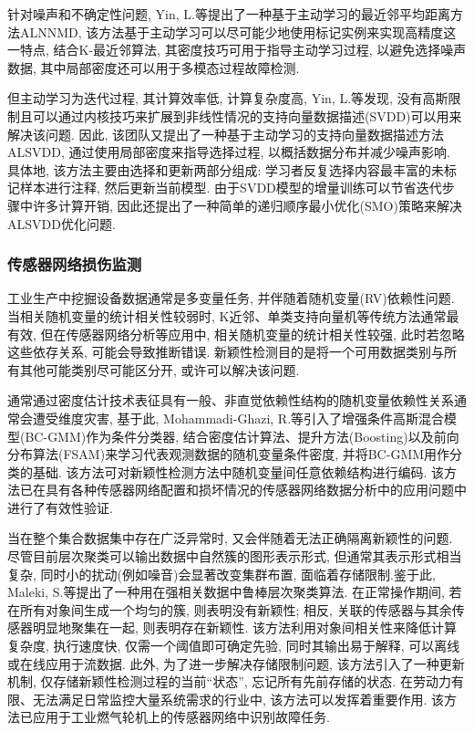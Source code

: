 \documentclass{Style/aas}
\begin{document}
\begin{multicols}{2}
  针对噪声和不确定性问题, Yin, L.等\cite{yin2018active}提出了一种基于主动学习的最近邻平均距离方法ALNNMD, 该方法基于主动学习可以尽可能少地使用标记实例来实现高精度这一特点, 结合K-最近邻算法, 其密度技巧可用于指导主动学习过程, 以避免选择噪声数据, 其中局部密度还可以用于多模态过程故障检测.

  但主动学习为迭代过程, 其计算效率低, 计算复杂度高, Yin, L.等\cite{yin2018active}发现, 没有高斯限制且可以通过内核技巧来扩展到非线性情况的支持向量数据描述(SVDD)可以用来解决该问题. 因此, 该团队又提出了一种基于主动学习的支持向量数据描述方法ALSVDD, 通过使用局部密度来指导选择过程, 以概括数据分布并减少噪声影响. 具体地, 该方法主要由选择和更新两部分组成: 学习者反复选择内容最丰富的未标记样本进行注释, 然后更新当前模型. 由于SVDD模型的增量训练可以节省迭代步骤中许多计算开销, 因此还提出了一种简单的递归顺序最小优化(SMO)策略来解决ALSVDD优化问题.

  \subsubsection{传感器网络损伤监测}

  工业生产中挖掘设备数据通常是多变量任务, 并伴随着随机变量(RV)依赖性问题. 当相关随机变量的统计相关性较弱时, K近邻、单类支持向量机等传统方法通常最有效, 但在传感器网络分析\cite{ghazi2017pairwise}等应用中, 相关随机变量的统计相关性较强, 此时若忽略这些依存关系, 可能会导致推断错误. 新颖性检测目的是将一个可用数据类别与所有其他可能类别尽可能区分开, 或许可以解决该问题.

  通常通过密度估计技术表征具有一般、非直觉依赖性结构的随机变量依赖性关系通常会遭受维度灾害, 基于此, Mohammadi-Ghazi, R.等\cite{mohammadi2018conditional}引入了增强条件高斯混合模型(BC-GMM)作为条件分类器, 结合密度估计算法、提升方法(Boosting)以及前向分布算法(FSAM)来学习代表观测数据的随机变量条件密度, 并将BC-GMM用作分类的基础. 该方法可对新颖性检测方法中随机变量间任意依赖结构进行编码. 该方法已在具有各种传感器网络配置和损坏情况的传感器网络数据分析中的应用问题中进行了有效性验证.

  当在整个集合数据集中存在广泛异常时, 又会伴随着无法正确隔离新颖性的问题. 尽管目前层次聚类可以输出数据中自然簇的图形表示形式, 但通常其表示形式相当复杂\cite{rehn2018efficient}, 同时小的扰动(例如噪音)会显著改变集群布置, 面临着存储限制.鉴于此, Maleki, S.等\cite{maleki2019robust}提出了一种用在强相关数据中鲁棒层次聚类算法. 在正常操作期间, 若在所有对象间生成一个均匀的簇, 则表明没有新颖性; 相反, 关联的传感器与其余传感器明显地聚集在一起, 则表明存在新颖性. 该方法利用对象间相关性来降低计算复杂度, 执行速度快, 仅需一个阈值即可确定先验, 同时其输出易于解释, 可以离线或在线应用于流数据. 此外, 为了进一步解决存储限制问题, 该方法引入了一种更新机制, 仅存储新颖性检测过程的当前“状态”, 忘记所有先前存储的状态. 在劳动力有限、无法满足日常监控大量系统需求的行业中, 该方法可以发挥着重要作用. 该方法已应用于工业燃气轮机上的传感器网络中识别故障任务.


\end{multicols}
\end{document}
